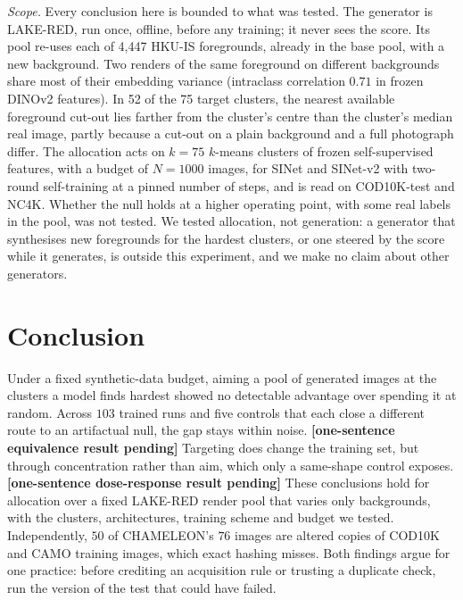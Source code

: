 \documentclass{article}
\newcommand{\cdrshort}{\textbf{[one-sentence dose-response result pending]}}
\newcommand{\eqshort}{\textbf{[one-sentence equivalence result pending]}}
\begin{document}
\textit{Scope.} Every conclusion here is bounded to what was tested. The generator is LAKE-RED, run once, offline,
before any training; it never sees the score. Its pool re-uses each of 4,447 HKU-IS foregrounds, already in the base pool, with a new background. Two renders of
the same foreground on different backgrounds share most of their embedding variance (intraclass correlation $0.71$ in
frozen DINOv2 features). In 52 of the 75 target clusters, the nearest available foreground cut-out lies farther from
the cluster's centre than the cluster's median real image, partly because a cut-out on a plain background and a full
photograph differ. The allocation acts on $k = 75$ $k$-means clusters of frozen self-supervised features,
with a budget of $N = 1000$ images, for SINet and SINet-v2 with two-round self-training at a pinned number of
steps, and is read on COD10K-test and NC4K. Whether the null holds at a higher operating point, with some real labels in the pool, was not tested. We tested allocation, not generation: a generator that synthesises new
foregrounds for the hardest clusters, or one steered by the score while it generates, is outside this experiment, and
we make no claim about other generators.


\section{Conclusion}
\label{sec:conclusion}
Under a fixed synthetic-data budget, aiming a pool of generated images at the clusters a model finds hardest showed no detectable advantage over spending it at random. Across $103$ trained runs and five controls that each close a different
route to an artifactual null, the gap stays within noise. \eqshort{} Targeting does change the training set,
but through concentration rather than aim, which only a same-shape control exposes. \cdrshort{} These conclusions hold
for allocation over a fixed LAKE-RED render pool that varies only backgrounds, with the clusters, architectures,
training scheme and budget we tested. Independently,
$50$ of CHAMELEON's $76$ images are altered copies of COD10K and CAMO training images, which exact
hashing misses. Both findings argue for one practice: before crediting an acquisition rule or
trusting a duplicate check, run the version of the test that could have failed.
\end{document}
